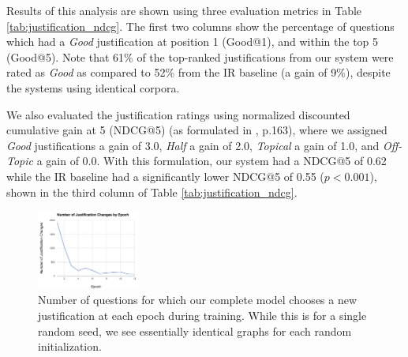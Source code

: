 Results of this analysis are shown using three evaluation metrics in Table \ref{tab:justification_ndcg}.  The first two columns show the percentage of questions which had a \emph{Good} justification at position 1 (Good@1), and within the top 5 (Good@5).  
Note that 61\% of the top-ranked justifications from our system were rated as \emph{Good} as compared to 52\% from the IR baseline (a gain of 9\%), despite the systems using identical corpora.  

We also evaluated the justification ratings using normalized discounted cumulative gain at 5 (NDCG@5) (as formulated in \citet{manning08}, p.163), where we assigned \emph{Good} justifications a gain of 3.0, \emph{Half} a gain of 2.0, \emph{Topical} a gain of 1.0, and \emph{Off-Topic} a gain of 0.0.  With this formulation, our system had a NDCG@5 of 0.62 while the IR baseline had a significantly lower NDCG@5 of 0.55 ($p < 0.001$), shown in the third column of Table \ref{tab:justification_ndcg}. 

\begin{figure}[t]
\begin{center}
\includegraphics[width=0.3\textwidth]{justificationChanges.png}
\caption{Number of questions for which %
our complete model chooses a new justification at each epoch during training.  While this is for a single random seed, we see essentially identical graphs for each random initialization.}
\label{fig:changes}
\vspace{-5mm}
\end{center}
\end{figure}

\vspace{-2mm}
